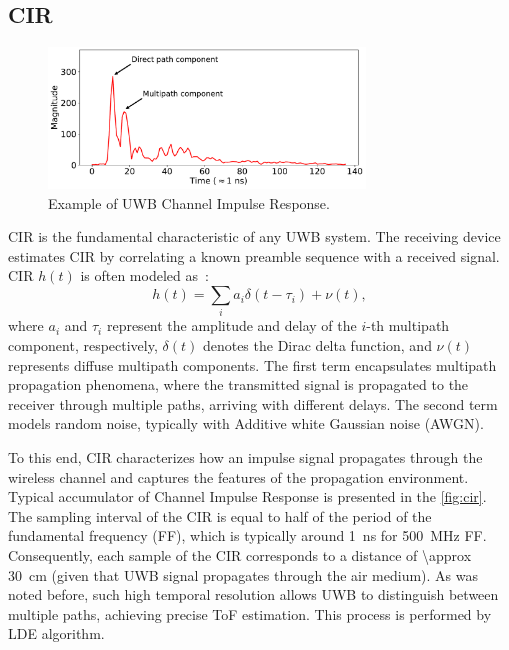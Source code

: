 \subsection{CIR}\label{cir_theory}

\begin{figure}[tbh]
\includegraphics[width=0.75\textwidth]{Figures/theoretical_background/cir_sample.pdf}
\centering
\caption{Example of UWB Channel Impulse Response.}
\label{fig:cir}
\end{figure}

CIR is the fundamental characteristic of any UWB system. The receiving device estimates CIR by correlating a known preamble sequence with a received signal. CIR $h(t)$ is often modeled as~\cite{cheraghinia2024comprehensive}:
\begin{equation}
h(t) = \sum_{i} a_i \delta(t - \tau_i) + \nu(t),
\end{equation}
where $a_i$ and $\tau_i$ represent the amplitude and delay of the $i$-th multipath component, respectively, $\delta(t)$ denotes the Dirac delta function, and $\nu(t)$ represents diffuse multipath components. The first term encapsulates multipath propagation phenomena, where the transmitted signal is propagated to the receiver through multiple paths, arriving with different delays. The second term models random noise, typically with Additive white Gaussian noise (AWGN).

To this end, CIR characterizes how an impulse signal propagates through the wireless channel and captures the features of the propagation environment. Typical accumulator of Channel Impulse Response is presented in the \autoref{fig:cir}. The sampling interval of the CIR is equal to half of the period of the fundamental frequency (FF), which is typically around \SI{1}{\nano\second} for \SI{500}{\mega\hertz} FF. Consequently, each sample of the CIR corresponds to a distance of \SI{\approx 30}{\centi\metre} (given that UWB signal propagates through the air medium). As was noted before, such high temporal resolution allows UWB to distinguish between multiple paths, achieving precise ToF estimation. This process is performed by LDE algorithm.

